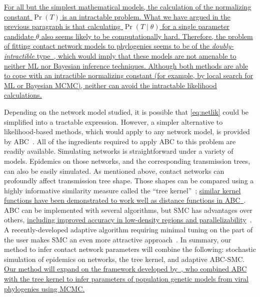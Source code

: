 {{\color{blue}\uline{
\uline{
For all but the simplest mathematical models, the calculation of the
normalizing constant $\Pr(T)$ is an intractable problem. 
What we have argued in
the previous paragraph is that calculating $\Pr(T \mid \theta)$ for a single
parameter candidate $\theta$ also seems likely to be computationally hard.
Therefore, the problem of fitting contact network models to phylogenies seems
to be of the \emph{doubly-intractible} type~\autocite{murray2012mcmc}, which
would imply that these models are not amenable to neither \gls{ML} nor Bayesian
inference techniques. Although both methods are able to cope with an
intractible normalizing constant (for example, by local search for \gls{ML} or
Bayesian \gls{MCMC}), neither can avoid the intractable likelihood
calculations. }}

Depending on the network model studied, it is possible that \cref{eq:netlik}
could be simplified into a tractable expression. However, a simpler alternative
to likelihood-based methods, which would apply to any network model, is
provided by \gls{ABC}~\autocite{rubin1984bayesianly, tavare1997inferring,
fu1997estimating, beaumont2002approximate}. All of the ingredients required to
apply \gls{ABC} to this problem are readily available. Simulating networks is
straightforward under a variety of models. Epidemics on those networks, and the
corresponding transmission trees, can also be easily simulated. As mentioned
above, contact networks can profoundly affect transmission tree shape. Those
shapes can be compared using a highly informative similarity measure called the
``tree kernel''~\autocite{poon2013mapping}; {\color{blue}\uline{similar kernel
functions have been demonstrated to work well as distance functions in
\gls{ABC}~\autocite{park2015k2}}}. \Gls{ABC} can be implemented with several
algorithms, but \gls{SMC} has advantages over others,
{\color{blue}\uline{including improved accuracy in low-density regions and
parallelizability}}~\autocite{mckinley2009inference}. A recently-developed
adaptive algorithm requiring minimal tuning on the part of the user makes
\gls{SMC} an even more attractive approach~\autocite{del2012adaptive}. In
summary, our method to infer contact network parameters will combine the
following: stochastic simulation of epidemics on networks, the tree kernel, and
adaptive \gls{ABC}-\gls{SMC}. {\color{blue}\uline{ Our method will expand on
the framework developed by~\autocite{poon2015phylodynamic}, who combined
\gls{ABC} with the tree kernel to infer parameters of population genetic models
from viral phylogenies using \gls{MCMC}. }}

}}
